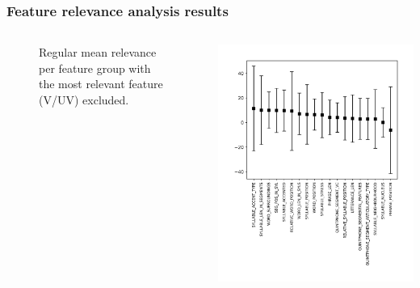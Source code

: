 \documentclass[a4paper,9pt]{beamer}
\theoremstyle{mytheoremstyle}
\begin{document}
\begin{frame}
\frametitle{Feature relevance analysis results}
\begin{columns}
\begin{figure}
	\caption{Regular mean relevance per feature group with the most relevant feature (V/UV) excluded.}
\end{figure}
\begin{center}
  \includegraphics[width=\textwidth]{res/feature_relevance_ranking_-_mean_(sum)_-_general_feature_categories_-_no_vuv}
\end{center}
\end{columns}
\end{frame}
\end{document}
